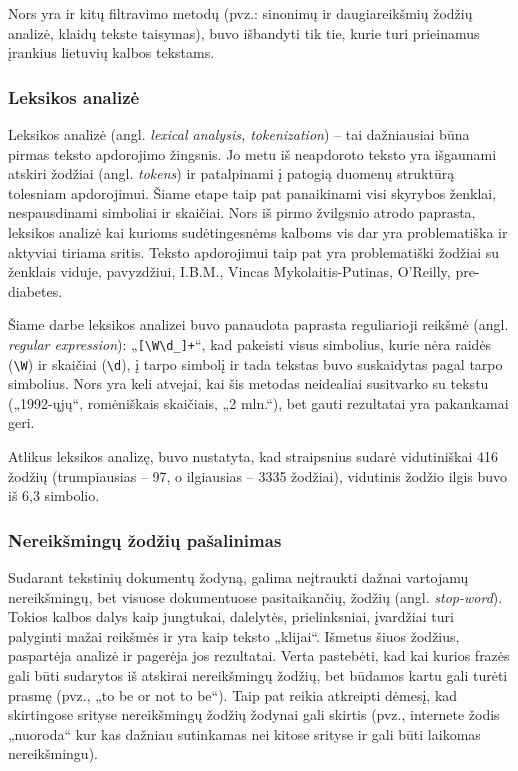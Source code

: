 \documentclass{VUMIFInfBakalaurinis}
\begin{document}
Nors yra ir kitų filtravimo metodų (pvz.: sinonimų ir daugiareikšmių
žodžių analizė, klaidų tekste taisymas), buvo išbandyti tik tie, kurie
turi prieinamus įrankius lietuvių kalbos tekstams.

\subsubsection{Leksikos analizė}

Leksikos analizė (angl. \emph{lexical analysis, tokenization}) -- tai
dažniausiai būna pirmas teksto apdorojimo žingsnis. Jo metu iš
neapdoroto teksto yra išgaunami atskiri žodžiai (angl. \emph{tokens}) ir
patalpinami į patogią duomenų struktūrą tolesniam apdorojimui. Šiame
etape taip pat panaikinami visi skyrybos ženklai, nespausdinami
simboliai ir skaičiai. Nors iš pirmo žvilgsnio atrodo paprasta, leksikos
analizė kai kurioms sudėtingesnėms kalboms vis dar yra problematiška ir
aktyviai tiriama sritis. Teksto apdorojimui taip pat yra problematiški
žodžiai su ženklais viduje, pavyzdžiui, I.B.M., Vincas
Mykolaitis-Putinas, O'Reilly, pre-diabetes.

Šiame darbe leksikos analizei buvo panaudota paprasta reguliarioji
reikšmė (angl. \emph{regular expression}):
„\texttt{{[}\textbackslash W\textbackslash d\_{]}+}“, kad pakeisti visus
simbolius, kurie nėra raidės (\texttt{\textbackslash W}) ir skaičiai
(\texttt{\textbackslash d}), į tarpo simbolį ir tada tekstas buvo suskaidytas
pagal tarpo simbolius. Nors yra keli atvejai, kai šis metodas neidealiai
susitvarko su tekstu („1992-ųjų“, romėniškais skaičiais, „2 mln.“),
bet gauti rezultatai yra pakankamai geri.

Atlikus leksikos analizę, buvo nustatyta, kad straipsnius sudarė
vidutiniškai 416 žodžių (trumpiausias -- 97, o ilgiausias -- 3335
žodžiai), vidutinis žodžio ilgis buvo iš 6,3 simbolio.

\subsubsection{Nereikšmingų žodžių pašalinimas}

Sudarant tekstinių dokumentų žodyną, galima neįtraukti dažnai vartojamų
nereikšmingų, bet visuose dokumentuose pasitaikančių, žodžių (angl.
\emph{stop-word}). Tokios kalbos dalys kaip jungtukai, dalelytės,
prielinksniai, įvardžiai turi palyginti mažai reikšmės ir yra kaip
teksto „klijai“. Išmetus šiuos žodžius, paspartėja analizė ir pagerėja
jos rezultatai. Verta pastebėti, kad kai kurios frazės gali būti
sudarytos iš atskirai nereikšmingų žodžių, bet būdamos kartu gali turėti
prasmę (pvz., „to be or not to be“). Taip pat reikia atkreipti dėmesį,
kad skirtingose srityse nereikšmingų žodžių žodynai gali skirtis (pvz.,
internete žodis „nuoroda“ kur kas dažniau sutinkamas nei kitose srityse
ir gali būti laikomas nereikšmingu).
\end{document}
